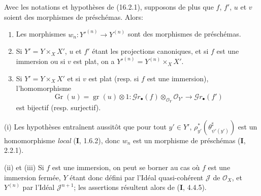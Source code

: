 \begin{proposition}[16.2.2]
\label{IV.16.2.2}
Avec les notations et hypothèses de \textup{(16.2.1)}, supposons de plus que $f$, $f'$,
$u$ et $v$ soient des morphismes de préschémas. Alors:
\begin{enumerate}
\item[\textup{(i)}] Les morphismes $w_n:Y'^{(n)}\to Y^{(n)}$ sont des morphismes de
préschémas.
\item[\textup{(ii)}] Si $Y'=Y\times_X X'$, $u$ et $f'$ étant les projections
canoniques, et si $f$ est une immersion \textup{ou} si $v$ est plat, on a
$Y'^{(n)}=Y^{(n)}\times_X X'$.
\item[\textup{(iii)}] Si $Y'=Y\times_X X'$ et si $v$ est plat \textup{(resp.} si $f$ est une
immersion\textup{)}, l'homomorphisme
\[
  \operatorname{Gr}(u)=\operatorname{gr}(u)\otimes 1:
  \mathscr{G}r_\bullet(f)\otimes_{\mathcal{O}_Y}\mathcal{O}_{Y'}
  \longrightarrow\mathscr{G}r_\bullet(f')
\]
est bijectif \textup{(resp.} surjectif\textup{)}.
\end{enumerate}
\end{proposition}

\noindent(i) Les hypothèses entraînent aussitôt que pour tout $y'\in Y'$,
$\rho_{y'}^*(\theta_{\psi'(y')}^\sharp)$ est un homomorphisme \emph{local} (\textbf{I}, 1.6.2),
donc $w_n$ est un morphisme de préschémas (\textbf{I}, 2.2.1).

\noindent(ii) et (iii) Si $f$ est une immersion, on peut se borner au cas où
$f$ est une immersion fermée, $Y$ étant donc défini par l'Idéal
quasi-cohérent $\mathscr{J}$ de $\mathcal{O}_X$, et $Y^{(n)}$ par l'Idéal
$\mathscr{J}^{n+1}$; les assertions résultent alors de (\textbf{I}, 4.4.5).

